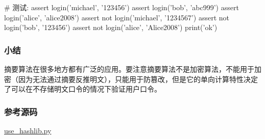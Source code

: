 \begin{pythoncode}
# 测试:
assert login('michael', '123456')
assert login('bob', 'abc999')
assert login('alice', 'alice2008')
assert not login('michael', '1234567')
assert not login('bob', '123456')
assert not login('alice', 'Alice2008')
print('ok')
\end{pythoncode}

\hypertarget{ux5c0fux7ed3}{%
\subsubsection{小结}\label{ux5c0fux7ed3}}

摘要算法在很多地方都有广泛的应用。要注意摘要算法不是加密算法，不能用于加密（因为无法通过摘要反推明文），只能用于防篡改，但是它的单向计算特性决定了可以在不存储明文口令的情况下验证用户口令。

\hypertarget{ux53c2ux8003ux6e90ux7801}{%
\subsubsection{参考源码}\label{ux53c2ux8003ux6e90ux7801}}

\href{https://github.com/michaelliao/learn-python3/blob/master/samples/commonlib/use_hashlib.py}{use\_hashlib.py}

